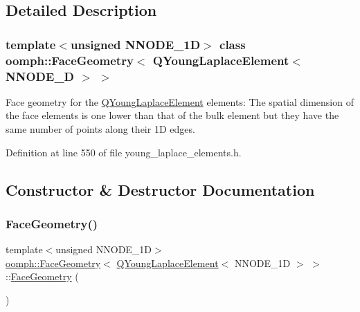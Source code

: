 \subsection{Detailed Description}
\subsubsection*{template$<$unsigned N\+N\+O\+D\+E\+\_\+1D$>$\newline
class oomph\+::\+Face\+Geometry$<$ Q\+Young\+Laplace\+Element$<$ N\+N\+O\+D\+E\+\_\+D $>$ $>$}

Face geometry for the \hyperlink{classoomph_1_1QYoungLaplaceElement}{Q\+Young\+Laplace\+Element} elements\+: The spatial dimension of the face elements is one lower than that of the bulk element but they have the same number of points along their 1D edges. 

Definition at line 550 of file young\+\_\+laplace\+\_\+elements.\+h.



\subsection{Constructor \& Destructor Documentation}
\mbox{\label{classoomph_1_1FaceGeometry_3_01QYoungLaplaceElement_3_01NNODE__1D_01_4_01_4_ae4250df7c43cfc267d465f30f60fbb82}} 
\subsubsection{\texorpdfstring{Face\+Geometry()}{FaceGeometry()}}
{\footnotesize\ttfamily template$<$unsigned N\+N\+O\+D\+E\+\_\+1D$>$ \\
\hyperlink{classoomph_1_1FaceGeometry}{oomph\+::\+Face\+Geometry}$<$ \hyperlink{classoomph_1_1QYoungLaplaceElement}{Q\+Young\+Laplace\+Element}$<$ N\+N\+O\+D\+E\+\_\+1D $>$ $>$\+::\hyperlink{classoomph_1_1FaceGeometry}{Face\+Geometry} (\begin{DoxyParamCaption}{ }\end{DoxyParamCaption})\hspace{0.3cm}{\ttfamily [inline]}}




